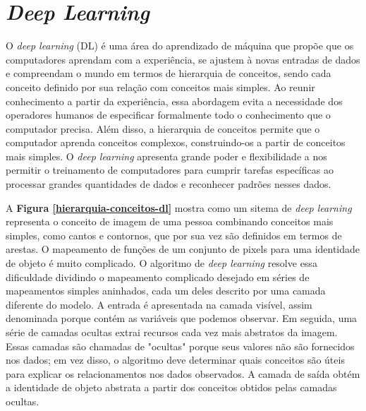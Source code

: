 \section{\textit{Deep Learning}}


 O \textit{deep learning} (DL) é uma área do aprendizado de máquina que propõe que os computadores aprendam com a experiência, se ajustem à novas entradas de dados e compreendam o mundo em termos de hierarquia de conceitos, sendo cada conceito definido por sua relação com conceitos mais simples. 
 Ao reunir conhecimento a partir da experiência, essa abordagem evita a necessidade dos operadores humanos de especificar formalmente todo o conhecimento que o computador precisa. Além disso, a hierarquia de conceitos permite que o computador aprenda conceitos complexos, construindo-os a partir de conceitos mais simples. O \textit{deep learning} apresenta grande poder e flexibilidade a nos permitir o treinamento de computadores para cumprir tarefas específicas ao processar grandes quantidades de dados e reconhecer padrões nesses dados.


 A \textbf{Figura \ref{hierarquia-conceitos-dl}} mostra como um sitema de \textit{deep learning} representa o conceito de imagem de uma pessoa combinando conceitos mais simples, como cantos e contornos, que por sua vez são definidos em termos de arestas. 
 O mapeamento de funções de um conjunto de pixels para uma identidade de objeto é muito complicado. O algoritmo de \textit{deep learning} resolve essa dificuldade dividindo o mapeamento complicado desejado em séries de mapeamentos simples aninhados, cada um deles descrito por uma camada diferente do modelo. A entrada é apresentada na camada visível, assim denominada porque contém as variáveis que podemos observar.
 Em seguida, uma série de camadas ocultas extrai recursos cada vez mais abstratos da imagem. Essas camadas são chamadas de "ocultas" porque seus valores não são fornecidos nos dados; em vez disso, o algoritmo deve determinar quais conceitos são úteis para explicar os relacionamentos nos dados observados. A camada de saída obtém a identidade de objeto abstrata a partir dos conceitos obtidos pelas camadas ocultas.


